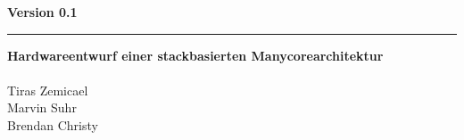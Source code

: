 \documentclass[11pt,openright]{scrbook}
\def\authorone{Tiras Zemicael} %
\def\authortwo{Marvin Suhr} %
\def\authorthree{Brendan Christy} %
\def\edition{Version 0.1} %
\def\title{Hardwareentwurf einer stackbasierten Manycorearchitektur} %
\def\subtitle{} %
\def\linecolor{\color{blue}}
\begin{document}
\begin{titlepage}
  \raggedleft
  \LARGE\textsf{\textbf{\edition}}\\
  \vspace{5pt}
  {\linecolor\hrule}
  \vspace{12pt}
  \Huge\textsf{\textbf{\title}}\\
  \vspace{6pt}
  \LARGE \textbf{\subtitle}\\
  \vfill
  \Large
  \authorone
  \\\authortwo
  \\\authorthree
  
  \vspace{10pt}
\end{titlepage}

\tableofcontents


\end{document}
